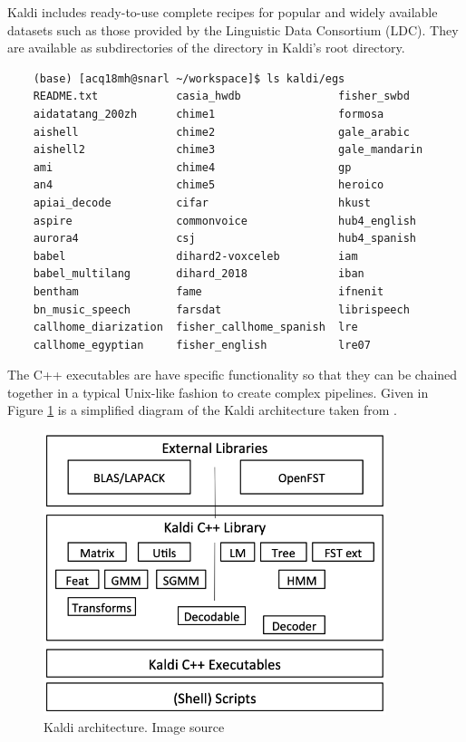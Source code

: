 	Kaldi includes ready-to-use complete recipes for popular and widely available datasets such as those provided by the Linguistic Data Consortium (LDC). They are available as subdirectories of the  directory in Kaldi's root directory.
	
	\begin{verbatim}
	(base) [acq18mh@snarl ~/workspace]$ ls kaldi/egs
	README.txt            casia_hwdb               fisher_swbd
	aidatatang_200zh      chime1                   formosa
	aishell               chime2                   gale_arabic
	aishell2              chime3                   gale_mandarin
	ami                   chime4                   gp
	an4                   chime5                   heroico
	apiai_decode          cifar                    hkust
	aspire                commonvoice              hub4_english
	aurora4               csj                      hub4_spanish
	babel                 dihard2-voxceleb         iam
	babel_multilang       dihard_2018              iban
	bentham               fame                     ifnenit
	bn_music_speech       farsdat                  librispeech
	callhome_diarization  fisher_callhome_spanish  lre
	callhome_egyptian     fisher_english           lre07
	\end{verbatim}
	
	The C++ executables are have specific functionality so that they can be chained together in a typical Unix-like fashion to create complex pipelines. Given in Figure \ref{fig:fig-kaldi} is a simplified diagram of the Kaldi architecture taken from \cite{povey2011kaldi}.
	
	\begin{figure}[t]
		\includegraphics[width=10cm]{figures/kaldi.png}
		\centering
		\caption{Kaldi architecture. Image source \cite{povey2011kaldi}}
		\label{fig:fig-kaldi}
	\end{figure}
	
